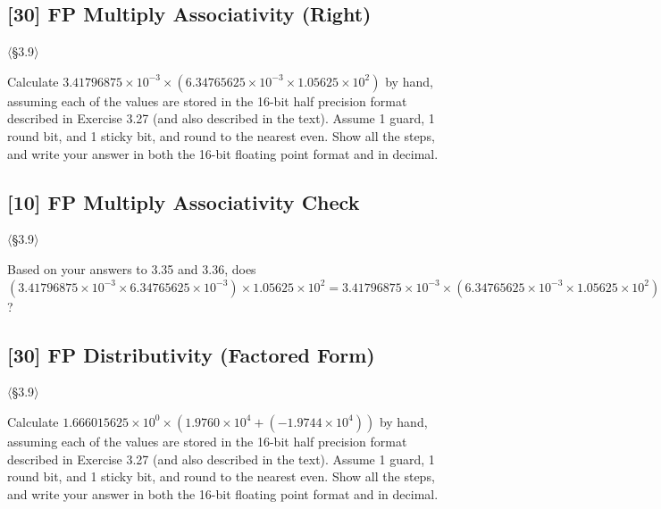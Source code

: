 \problembreak

\subsection{[30] FP Multiply Associativity (Right)}
\hypertarget{prob-3.36}{}
\noindent$\langle$\S3.9$\rangle$\medskip

\noindent Calculate $3.41796875 \times 10^{-3} \times (6.34765625
\times 10^{-3} \times 1.05625 \times 10^{2})$ by hand, assuming each of the
values are stored in the 16-bit half precision format described in
Exercise 3.27 (and also described in the text). Assume 1 guard, 1 round bit,
and 1 sticky bit, and round to the nearest even. Show all the steps, and
write your answer in both the 16-bit floating point format and in decimal.

\problembreak

\subsection{[10] FP Multiply Associativity Check}
\hypertarget{prob-3.37}{}
\noindent$\langle$\S3.9$\rangle$\medskip

\noindent Based on your answers to 3.35 and 3.36, does
$(3.41796875 \times 10^{-3} \times 6.34765625 \times 10^{-3})
\times 1.05625 \times 10^{2} = 3.41796875 \times 10^{-3}
\times (6.34765625 \times 10^{-3} \times 1.05625 \times 10^{2})$?

\problembreak

\subsection{[30] FP Distributivity (Factored Form)}
\hypertarget{prob-3.38}{}
\noindent$\langle$\S3.9$\rangle$\medskip

\noindent Calculate $1.666015625 \times 10^{0} \times (1.9760 \times 10^{4}
+ (-1.9744 \times 10^{4}))$ by hand, assuming each of the values are stored
in the 16-bit half precision format described in Exercise 3.27 (and also
described in the text). Assume 1 guard, 1 round bit, and 1 sticky bit, and
round to the nearest even. Show all the steps, and write your answer in both
the 16-bit floating point format and in decimal.

\problembreak


